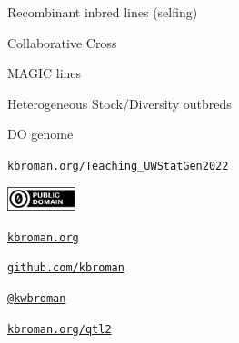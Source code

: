 \documentclass[aspectratio=169,12pt,t]{beamer}
\begin{document}
\begin{frame}[c]{Recombinant inbred lines (selfing)}
\end{frame}

\begin{frame}[c]{Collaborative Cross}
\end{frame}

\begin{frame}[c]{MAGIC lines}
\end{frame}

\begin{frame}[c]{Heterogeneous Stock/Diversity outbreds}
\end{frame}

\begin{frame}[c]{DO genome}
\end{frame}



\begin{frame}[c]{}

\Large

\href{https://kbroman.org/Teaching_UWStatGen2022}{\tt kbroman.org/Teaching\_UWStatGen2022}

\vspace*{-7mm}
\hfill
\href{https://creativecommons.org/publicdomain/zero/1.0/}{\includegraphics[height=7mm]{Figs/cc-zero.png}}

\vspace{3mm}

\href{https://kbroman.org}{\tt \lolit kbroman.org}

\vspace{4mm}

\href{https://github.com/kbroman}{\tt \lolit github.com/kbroman}

\vspace{4mm}

\href{https://twitter.com/kwbroman}{\tt \lolit @kwbroman}

\vspace{4mm}

\href{https://kbroman.org/qtl2}{\tt \lolit kbroman.org/qtl2}





\end{frame}
\end{document}
